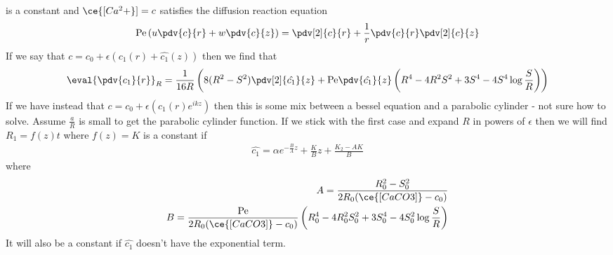 \documentclass[12pt]{article}
\newcommand{\Pe}{\mathrm{Pe}}
\begin{document}
\ce{[CaCO3]} is a constant and $\ce{[Ca^2+}]=c$ satisfies the diffusion reaction equation
\begin{align}
\Pe\left(u\pdv{c}{r}  + w\pdv{c}{z}\right) = \pdv[2]{c}{r}+\frac{1}{r}\pdv{c}{r} \pdv[2]{c}{z}
\end{align}
If we say that $c = c_0 + \epsilon\left(c_1(r) + \hat{c_1}(z)\right)$
then we find that \begin{align}
\eval{\pdv{c_1}{r}}_R= \frac{1}{16R}\left(8(R^2-S^2)\pdv[2]{\hat{c_1}}{z}+\Pe\pdv{\hat{c_1}}{z}\left(R^4-4R^2S^2+3S^4-4S^4\log\frac{S}{R}\right)\right)
\end{align}
 If we have instead that $c = c_0 + \epsilon\left(c_1(r)e^{ikz}\right)$ then this is some mix between a bessel equation and a parabolic cylinder - not sure how to solve. Assume $\frac{a}{R}$ is small to get the parabolic cylinder function.  
 If we stick with the first case and expand $R$ in powers of $\epsilon$ then we will find 
 $R_1 = f(z) t $ 
 where $f(z) = K$ is a constant if
 \begin{align}
 \hat{c_1} = \alpha e^{-\frac{B}{A}z} + \frac{K}{B}z+\frac{K_2-AK}{B}
 \end{align}
 where
 \begin{align}
 A = \frac{R_0^2 - S_0^2}{2R_0(\ce{[CaCO3]}-c_0)}\\
 B = \frac{\Pe}{2R_0(\ce{[CaCO3]}-c_0)}\left(R_0^4-4R_0^2S_0^2+3S_0^4-4S_0^2\log\frac{S}{R}\right)
 \end{align}
 It will also be a constant if $\hat{c_1}$ doesn't have the exponential term.
\end{document}
